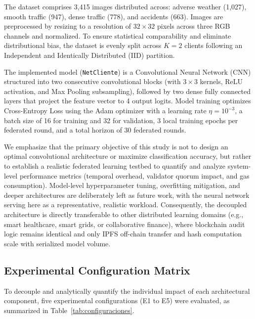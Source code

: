 The dataset comprises 3,415 images distributed across: adverse weather (1,027), smooth traffic (947), dense traffic (778), and accidents (663). Images are preprocessed by resizing to a resolution of $32 \times 32$ pixels across three RGB channels and normalized. To ensure statistical comparability and eliminate distributional bias, the dataset is evenly split across $K=2$ clients following an Independent and Identically Distributed (IID) partition.

The implemented model (\texttt{NetCliente}) is a Convolutional Neural Network (CNN) structured into two consecutive convolutional blocks (with $3 \times 3$ kernels, ReLU activation, and Max Pooling subsampling), followed by two dense fully connected layers that project the feature vector to 4 output logits. Model training optimizes Cross-Entropy Loss using the Adam optimizer with a learning rate $\eta = 10^{-3}$, a batch size of 16 for training and 32 for validation, 3 local training epochs per federated round, and a total horizon of 30 federated rounds.

We emphasize that the primary objective of this study is not to design an optimal convolutional architecture or maximize classification accuracy, but rather to establish a realistic federated learning testbed to quantify and analyze system-level performance metrics (temporal overhead, validator quorum impact, and gas consumption). Model-level hyperparameter tuning, overfitting mitigation, and deeper architectures are deliberately left as future work, with the neural network serving here as a representative, realistic workload. Consequently, the decoupled architecture is directly transferable to other distributed learning domains (e.g., smart healthcare, smart grids, or collaborative finance), where blockchain audit logic remains identical and only IPFS off-chain transfer and hash computation scale with serialized model volume.

\subsection{Experimental Configuration Matrix}
To decouple and analytically quantify the individual impact of each architectural component, five experimental configurations (E1 to E5) were evaluated, as summarized in Table~\ref{tab:configuraciones}.

